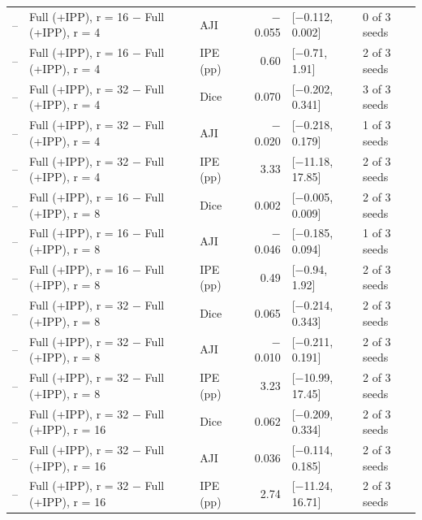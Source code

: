 \documentclass[10pt]{article}
\begin{document}
\begin{landscape}
{\begin{longtable}{r l l r l l}
-- & Full (+IPP), r = 16 $-$ Full (+IPP), r = 4 & AJI & $-$0.055 & [$-$0.112, 0.002] & 0 of 3 seeds \\
-- & Full (+IPP), r = 16 $-$ Full (+IPP), r = 4 & IPE (pp) & 0.60 & [$-$0.71, 1.91] & 2 of 3 seeds \\
-- & Full (+IPP), r = 32 $-$ Full (+IPP), r = 4 & Dice & 0.070 & [$-$0.202, 0.341] & 3 of 3 seeds \\
-- & Full (+IPP), r = 32 $-$ Full (+IPP), r = 4 & AJI & $-$0.020 & [$-$0.218, 0.179] & 1 of 3 seeds \\
-- & Full (+IPP), r = 32 $-$ Full (+IPP), r = 4 & IPE (pp) & 3.33 & [$-$11.18, 17.85] & 2 of 3 seeds \\
-- & Full (+IPP), r = 16 $-$ Full (+IPP), r = 8 & Dice & 0.002 & [$-$0.005, 0.009] & 2 of 3 seeds \\
-- & Full (+IPP), r = 16 $-$ Full (+IPP), r = 8 & AJI & $-$0.046 & [$-$0.185, 0.094] & 1 of 3 seeds \\
-- & Full (+IPP), r = 16 $-$ Full (+IPP), r = 8 & IPE (pp) & 0.49 & [$-$0.94, 1.92] & 2 of 3 seeds \\
-- & Full (+IPP), r = 32 $-$ Full (+IPP), r = 8 & Dice & 0.065 & [$-$0.214, 0.343] & 2 of 3 seeds \\
-- & Full (+IPP), r = 32 $-$ Full (+IPP), r = 8 & AJI & $-$0.010 & [$-$0.211, 0.191] & 2 of 3 seeds \\
-- & Full (+IPP), r = 32 $-$ Full (+IPP), r = 8 & IPE (pp) & 3.23 & [$-$10.99, 17.45] & 2 of 3 seeds \\
-- & Full (+IPP), r = 32 $-$ Full (+IPP), r = 16 & Dice & 0.062 & [$-$0.209, 0.334] & 2 of 3 seeds \\
-- & Full (+IPP), r = 32 $-$ Full (+IPP), r = 16 & AJI & 0.036 & [$-$0.114, 0.185] & 2 of 3 seeds \\
-- & Full (+IPP), r = 32 $-$ Full (+IPP), r = 16 & IPE (pp) & 2.74 & [$-$11.24, 16.71] & 2 of 3 seeds \\
\end{longtable}
}


\end{landscape}
\end{document}
